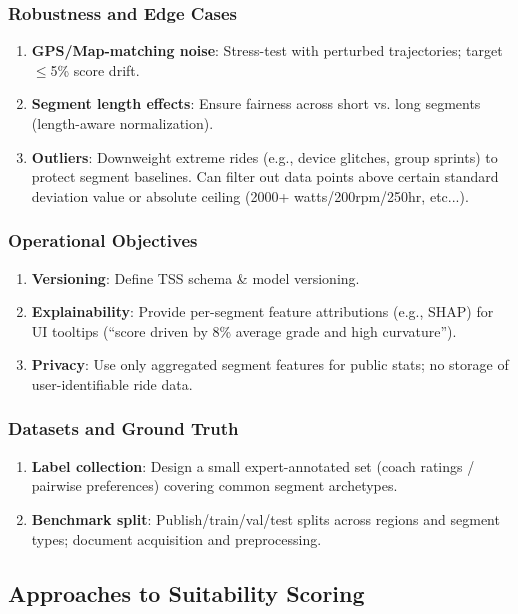 \documentclass[11pt,twoside]{report}
\begin{document}
\subsubsection{Robustness and Edge Cases}
\begin{enumerate}
	\item \textbf{GPS/Map-matching noise}: Stress-test with perturbed trajectories; target $\leq$5\% score drift.
	\item \textbf{Segment length effects}: Ensure fairness across short vs. long segments (length-aware normalization).
	\item \textbf{Outliers}: Downweight extreme rides (e.g., device glitches, group sprints) to protect segment baselines. Can filter out data points above
	      certain standard deviation value or absolute ceiling (2000+ watts/200rpm/250hr, etc...).
\end{enumerate}

\subsubsection{Operational Objectives}
\begin{enumerate}
	\item \textbf{Versioning}: Define TSS schema \& model versioning.
	\item \textbf{Explainability}: Provide per-segment feature attributions (e.g., SHAP) for UI tooltips (“score driven by 8\% average grade and high curvature”).
	\item \textbf{Privacy}: Use only aggregated segment features for public stats; no storage of user-identifiable ride data.
\end{enumerate}

\subsubsection{Datasets and Ground Truth}
\begin{enumerate}
	\item \textbf{Label collection}: Design a small expert-annotated set (coach ratings / pairwise preferences) covering common segment archetypes.
	\item \textbf{Benchmark split}: Publish/train/val/test splits across regions and segment types; document acquisition and preprocessing.
\end{enumerate}

\subsection{Approaches to Suitability Scoring}
\end{document}
